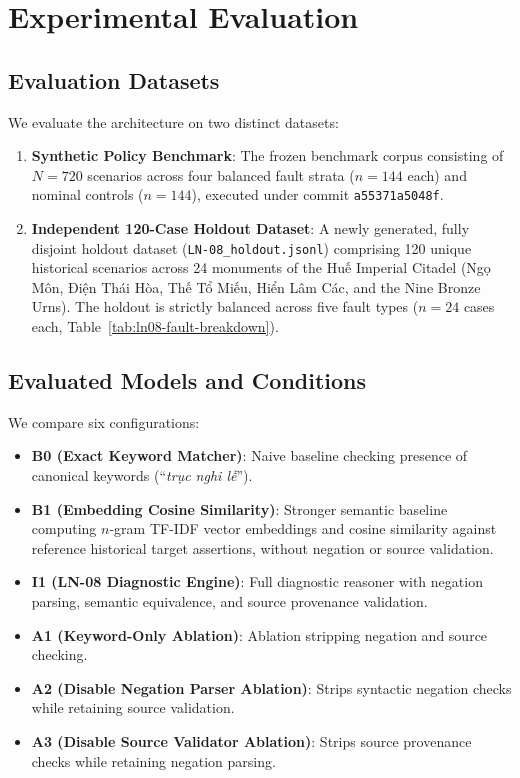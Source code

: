 \documentclass[11pt,a4paper]{article}
\begin{document}
\section{Experimental Evaluation}

\subsection{Evaluation Datasets}
We evaluate the architecture on two distinct datasets:
\begin{enumerate}[leftmargin=*]
    \item \textbf{Synthetic Policy Benchmark}: The frozen benchmark corpus consisting of $N=720$ scenarios across four balanced fault strata ($n=144$ each) and nominal controls ($n=144$), executed under commit \texttt{a55371a5048f}.
    \item \textbf{Independent 120-Case Holdout Dataset}: A newly generated, fully disjoint holdout dataset (\texttt{LN-08\_holdout.jsonl}) comprising 120 unique historical scenarios across 24 monuments of the Huế Imperial Citadel (Ngọ Môn, Điện Thái Hòa, Thế Tổ Miếu, Hiển Lâm Các, and the Nine Bronze Urns). The holdout is strictly balanced across five fault types ($n=24$ cases each, Table~\ref{tab:ln08-fault-breakdown}).
\end{enumerate}

\subsection{Evaluated Models and Conditions}
We compare six configurations:
\begin{itemize}[leftmargin=*]
    \item \textbf{B0 (Exact Keyword Matcher)}: Naive baseline checking presence of canonical keywords (``\textit{trục nghi lễ}'').
    \item \textbf{B1 (Embedding Cosine Similarity)}: Stronger semantic baseline computing $n$-gram TF-IDF vector embeddings and cosine similarity against reference historical target assertions, without negation or source validation.
    \item \textbf{I1 (LN-08 Diagnostic Engine)}: Full diagnostic reasoner with negation parsing, semantic equivalence, and source provenance validation.
    \item \textbf{A1 (Keyword-Only Ablation)}: Ablation stripping negation and source checking.
    \item \textbf{A2 (Disable Negation Parser Ablation)}: Strips syntactic negation checks while retaining source validation.
    \item \textbf{A3 (Disable Source Validator Ablation)}: Strips source provenance checks while retaining negation parsing.
\end{itemize}
\end{document}
